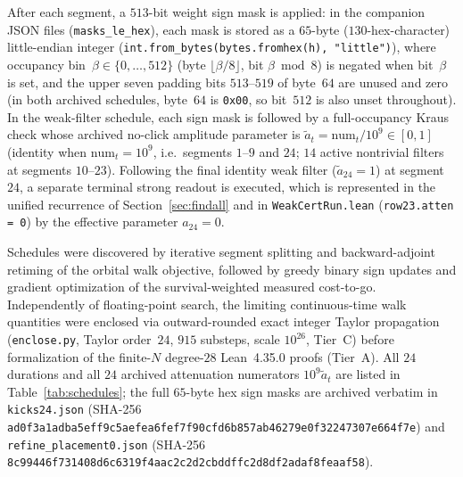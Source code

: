 \documentclass[11pt,a4paper]{article}
\theoremstyle{definition}
\theoremstyle{remark}
\begin{document}
After each segment, a \(513\)-bit weight sign mask is applied: in the companion JSON files (\texttt{masks\_le\_hex}), each mask is stored as a \(65\)-byte (\(130\)-hex-character) little-endian integer (\texttt{int.from\_bytes(bytes.fromhex(h), "little")}), where occupancy bin~\(\beta \in \{0,\dots,512\}\) (byte \(\lfloor \beta/8\rfloor\), bit \(\beta \bmod 8\)) is negated when bit~\(\beta\) is set, and the upper seven padding bits \(513\text{--}519\) of byte~\(64\) are unused and zero (in both archived schedules, byte~\(64\) is \texttt{0x00}, so bit~\(512\) is also unset throughout). In the weak-filter schedule, each sign mask is followed by a full-occupancy Kraus check whose archived no-click amplitude parameter is \(\widetilde{a}_t = \text{num}_t / 10^9 \in [0, 1]\) (identity when \(\text{num}_t = 10^9\), i.e.\ segments \(1\text{--}9\) and \(24\); \(14\) active nontrivial filters at segments \(10\text{--}23\)). Following the final identity weak filter (\(\widetilde{a}_{24} = 1\)) at segment~\(24\), a separate terminal strong readout is executed, which is represented in the unified recurrence of Section~\ref{sec:findall} and in \texttt{WeakCertRun.lean} (\texttt{row23.atten = 0}) by the effective parameter \(a_{24} = 0\).

Schedules were discovered by iterative segment splitting and backward-adjoint retiming of the orbital walk objective, followed by greedy binary sign updates and gradient optimization of the survival-weighted measured cost-to-go. Independently of floating-point search, the limiting continuous-time walk quantities were enclosed via outward-rounded exact integer Taylor propagation (\texttt{enclose.py}, Taylor order~\(24\), \(915\) substeps, scale \(10^{26}\), Tier~C) before formalization of the finite-\(N\) degree-\(28\) Lean~4.35.0 proofs (Tier~A). All \(24\) durations and all \(24\) archived attenuation numerators \(10^9 \widetilde{a}_t\) are listed in Table~\ref{tab:schedules}; the full \(65\)-byte hex sign masks are archived verbatim in \texttt{kicks24.json} (SHA-256 \texttt{ad0f3a1a\allowbreak dba5eff9\allowbreak c5aefea6\allowbreak fef7f90c\allowbreak fd6b857a\allowbreak b46279e0\allowbreak f3224730\allowbreak 7e664f7e}) and \texttt{refine\_placement0.json} (SHA-256 \texttt{8c99446f\allowbreak 731408d6\allowbreak c6319f4a\allowbreak ac2c2d2c\allowbreak bddffc2d\allowbreak 8df2adaf\allowbreak 8feaaf58}).
\end{document}
